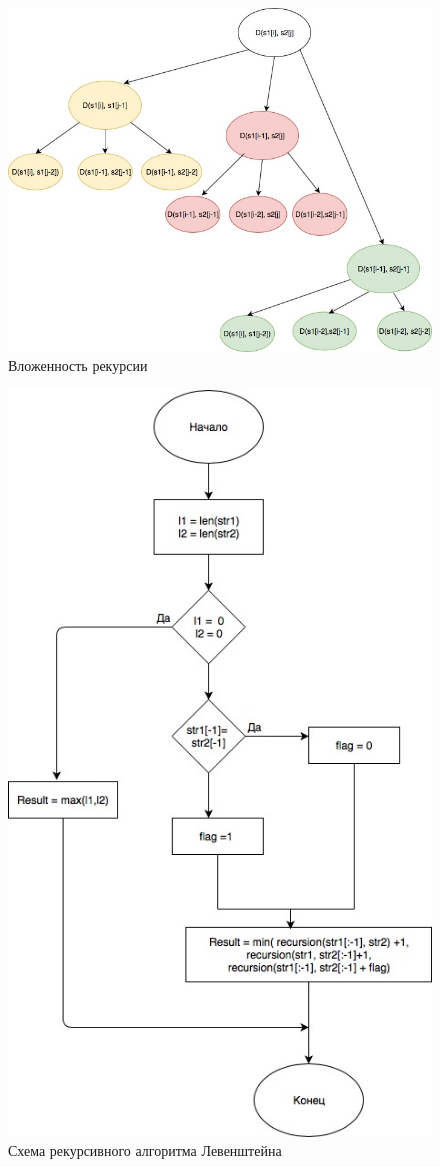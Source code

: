 \documentclass[12pt]{article}
\begin{document}
\begin{figure}[ht!]
	\centering
	\includegraphics[width=120mm]{list.jpg}
	\caption{Вложенность рекурсии\label{overflow}}
\end{figure}
\begin{figure}[ht!]
	\centering
	\includegraphics[width=120mm]{recursion.jpg}
	\caption{Схема рекурсивного алгоритма Левенштейна \label{overflow}}
\end{figure}
\end{document}
